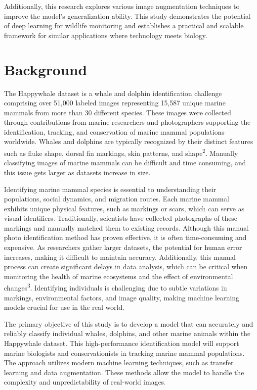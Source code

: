 \documentclass[twocolumn]{article}
\begin{document}
Additionally, this research explores various image augmentation techniques to improve the model's generalization ability. This study demonstrates the potential of deep learning for wildlife monitoring and establishes a practical and scalable framework for similar applications where technology meets biology.

\section{Background}
The Happywhale dataset is a whale and dolphin identification challenge comprising over 51,000 labeled images representing 15,587 unique marine mammals from more than 30 different species. These images were collected through contributions from marine researchers and photographers supporting the identification, tracking, and conservation of marine mammal populations worldwide. Whales and dolphins are typically recognized by their distinct features such as fluke shape, dorsal fin markings, skin patterns, and shape\textsuperscript{2}. Manually classifying images of marine mammals can be difficult and time consuming, and this issue gets larger as datasets increase in size. 

Identifying marine mammal species is essential to understanding their populations, social dynamics, and migration routes. Each marine mammal exhibits unique physical features, such as markings or scars, which can serve as visual identifiers. Traditionally, scientists have collected photographs of these markings and manually matched them to existing records. Although this manual photo identification method has proven effective, it is often time-consuming and expensive. As researchers gather larger datasets, the potential for human error increases, making it difficult to maintain accuracy. Additionally, this manual process can create significant delays in data analysis, which can be critical when monitoring the health of marine ecosystems and the effect of environmental changes\textsuperscript{3}. Identifying individuals is challenging due to subtle variations in markings, environmental factors, and image quality, making machine learning models crucial for use in the real world.

The primary objective of this study is to develop a model that can accurately and reliably classify individual whales, dolphins, and other marine animals within the Happywhale dataset. This high-performance identification model will support marine biologists and conservationists in tracking marine mammal populations. The approach utilizes modern machine learning techniques, such as transfer learning and data augmentation. These methods allow the model to handle the complexity and unpredictability of real-world images. 
\end{document}
